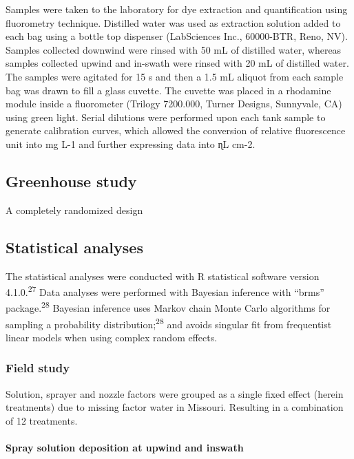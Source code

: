 \documentclass[
  12pt,
  a4paper,
]{article}
\begin{document}
Samples were taken to the laboratory for dye extraction and
quantification using fluorometry technique. Distilled water was used as
extraction solution added to each bag using a bottle top dispenser
(LabSciences Inc., 60000-BTR, Reno, NV). Samples collected downwind were
rinsed with 50 mL of distilled water, whereas samples collected upwind
and in-swath were rinsed with 20 mL of distilled water. The samples were
agitated for 15 s and then a 1.5 mL aliquot from each sample bag was
drawn to fill a glass cuvette. The cuvette was placed in a rhodamine
module inside a fluorometer (Trilogy 7200.000, Turner Designs,
Sunnyvale, CA) using green light. Serial dilutions were performed upon
each tank sample to generate calibration curves, which allowed the
conversion of relative fluorescence unit into mg L-1 and further
expressing data into ɳL cm-2.

\hypertarget{greenhouse-study}{%
\subsection{Greenhouse study}\label{greenhouse-study}}

A completely randomized design

\hypertarget{statistical-analyses}{%
\subsection{Statistical analyses}\label{statistical-analyses}}

The statistical analyses were conducted with R statistical software
version 4.1.0.\textsuperscript{27} Data analyses were performed with
Bayesian inference with ``brms'' package.\textsuperscript{28} Bayesian
inference uses Markov chain Monte Carlo algorithms for sampling a
probability distribution;\textsuperscript{28} and avoids singular fit
from frequentist linear models when using complex random effects.

\hypertarget{field-study-1}{%
\subsubsection{Field study}\label{field-study-1}}

Solution, sprayer and nozzle factors were grouped as a single fixed
effect (herein treatments) due to missing factor water in Missouri.
Resulting in a combination of 12 treatments.

\hypertarget{spray-solution-deposition-at-upwind-and-inswath}{%
\paragraph{Spray solution deposition at upwind and
inswath}\label{spray-solution-deposition-at-upwind-and-inswath}}
\end{document}
